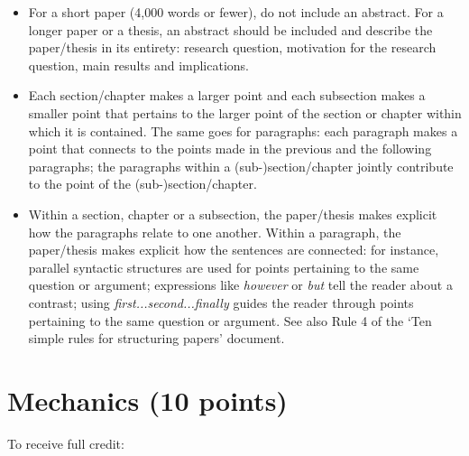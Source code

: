\documentclass[11pt,fleqn,a4paper/thesis]{article}
\newcommand{\6}{\mbox{$[\hspace*{-.6mm}[$}}
\newcommand{\9}{\mbox{$]\hspace*{-.6mm}]$}}
\begin{document}
\begin{itemize}[itemsep=-1pt,leftmargin=2.5ex,topsep=-2pt]
\item For a short paper (4,000 words or fewer), do not include an abstract. For a longer paper or a thesis, an abstract should be included and describe the paper/thesis in its entirety: research question, motivation for the research question, main results and implications.

\item Each section/chapter makes a larger point and each subsection makes a smaller point that pertains to the larger point of the section or chapter within
which it is contained. The same goes for paragraphs: each paragraph makes a point that connects to the points made in the previous and the following
paragraphs; the paragraphs within a (sub-)section/chapter jointly contribute to the point of the (sub-)section/chapter.

\item Within a section, chapter or a subsection, the paper/thesis makes explicit how the paragraphs relate to one another. Within a paragraph, the paper/thesis makes explicit how the sentences are connected: for instance, parallel syntactic structures are used for points pertaining to the same question or argument; expressions like {\em however} or {\em but} tell the reader about a contrast; using {\em first...second...finally} guides the reader through points pertaining to the same question or argument. See also Rule 4 of the `Ten simple rules for structuring papers' document.

\end{itemize}

\section{Mechanics (10 points)}

To receive full credit:
\end{document}
